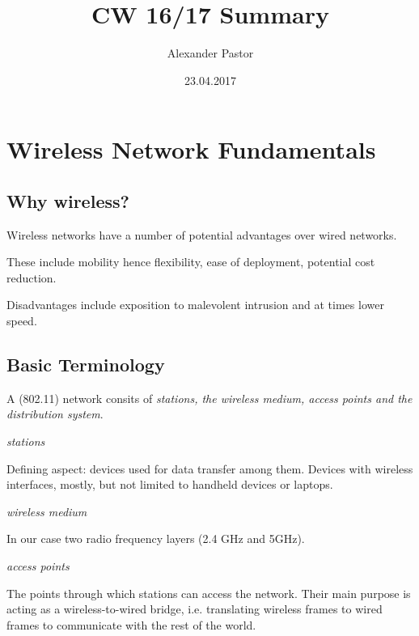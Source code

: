 \documentclass{article}
\begin{document}
	\title{CW 16/17 Summary}
	\author{Alexander Pastor}
	\date{23.04.2017}
	\maketitle
	\tableofcontents
	\newpage
	
	\section{Wireless Network Fundamentals}
	
	\subsection{Why wireless?}
	
	Wireless networks have a number of potential advantages over wired networks.
	
	\medskip
	
	These include mobility hence flexibility, ease of deployment, potential cost reduction.
	
	\smallskip
	
	Disadvantages include exposition to malevolent intrusion and at times lower speed. 
	
	\subsection{Basic Terminology}
	
	\vskip 0.1in
	
	A (802.11) network consits of \emph{stations, the wireless medium, access points and the distribution system}.
	
	\bigskip
	
	\emph{stations} 
	
	Defining aspect: devices used for data transfer among them. Devices with wireless interfaces, mostly, but not limited to handheld devices or laptops.
	
	\bigskip
	
	\emph{wireless medium} 
	
	In our case two radio frequency layers (2.4 GHz and 5GHz).
	
	\bigskip
	
	\emph{access points} 
	
	The points through which stations can access the network. Their main purpose is acting as a wireless-to-wired bridge, i.e. translating wireless frames to wired frames to communicate with the rest of the world.
	
\end{document}
